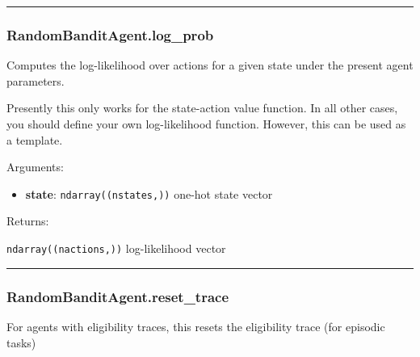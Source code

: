 \begin{center}\rule{0.5\linewidth}{\linethickness}\end{center}

\hypertarget{randombanditagent.log_prob}{%
\subsubsection{RandomBanditAgent.log\_prob}\label{randombanditagent.log_prob}}

\begin{Shaded}
\begin{Highlighting}[]
\end{Highlighting}
\end{Shaded}

Computes the log-likelihood over actions for a given state under the
present agent parameters.

Presently this only works for the state-action value function. In all
other cases, you should define your own log-likelihood function.
However, this can be used as a template.

Arguments:

\begin{itemize}
\tightlist
\item
  \textbf{state}: \texttt{ndarray((nstates,))} one-hot state vector
\end{itemize}

Returns:

\texttt{ndarray((nactions,))} log-likelihood vector

\begin{center}\rule{0.5\linewidth}{\linethickness}\end{center}

\hypertarget{randombanditagent.reset_trace}{%
\subsubsection{RandomBanditAgent.reset\_trace}\label{randombanditagent.reset_trace}}

\begin{Shaded}
\begin{Highlighting}[]
\OperatorTok{=}\NormalTok{)}
\end{Highlighting}
\end{Shaded}

For agents with eligibility traces, this resets the eligibility trace
(for episodic tasks)

